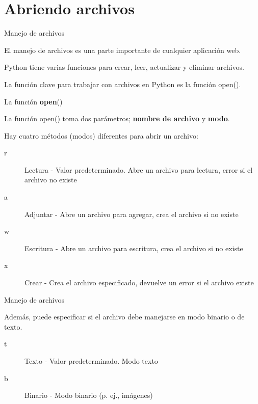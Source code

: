 
\section{Abriendo archivos}

\begin{frame}[c]{Manejo de archivos}

  El manejo de archivos es una parte importante de cualquier
  aplicación web.

  \vspace{\baselineskip}
  Python tiene varias funciones para crear, leer, actualizar y
  eliminar archivos.

  \vspace{\baselineskip}
  La función clave para trabajar con archivos en Python es la
  función \textcolor{codeKeyword2}{open}().
\end{frame}

\begin{frame}[c]{La función \textbf{open}()}

  La función \textcolor{codeKeyword2}{open}() toma dos parámetros;
  \textbf{nombre de archivo} y \textbf{modo}.

  \vspace{\baselineskip}
  Hay cuatro métodos (modos) diferentes para abrir un archivo: 

  \vspace{\baselineskip}
  \begin{description}
    \item[r] Lectura - Valor predeterminado. Abre un archivo para
      lectura, error si el archivo no existe
    \pausa
    \item[a] Adjuntar - Abre un archivo para agregar, crea el
      archivo si no existe
    \pausa
    \item[w] Escritura - Abre un archivo para escritura, crea el
      archivo si no existe
    \pausa
    \item[x] Crear - Crea el archivo especificado, devuelve un error
      si el archivo existe
  \end{description}
\end{frame}

\begin{frame}[c]{Manejo de archivos}

  Además, puede especificar si el archivo debe manejarse en
  modo binario o de texto.

  \vspace{\baselineskip}
  \begin{description}
    \item[t] Texto - Valor predeterminado. Modo texto
    \pausa
    \item[b] Binario - Modo binario (p. ej., imágenes)
  \end{description}
\end{frame}


